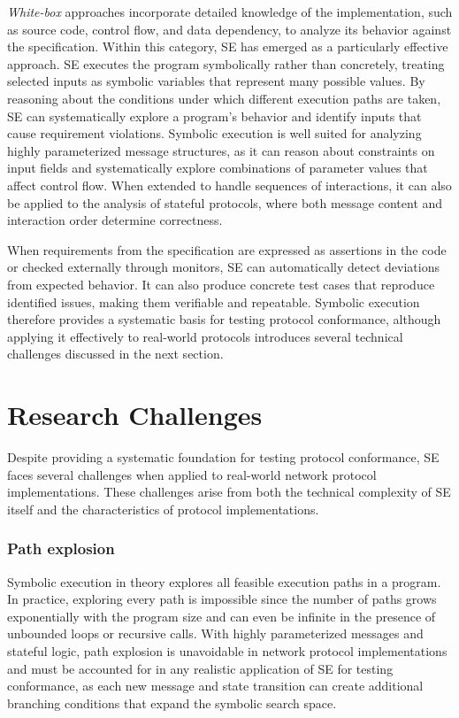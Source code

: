 \emph{White-box} approaches incorporate detailed knowledge of the implementation, such as source code, control flow, and data dependency, to analyze its behavior against the specification.
Within this category, SE has emerged as a particularly effective approach.
SE executes the program symbolically rather than concretely, treating selected inputs as symbolic variables that represent many possible values.
By reasoning about the conditions under which different execution paths are taken, SE can systematically explore a program's behavior and identify inputs that cause requirement violations.
Symbolic execution is well suited for analyzing highly parameterized message structures, as it can reason about constraints on input fields and systematically explore combinations of parameter values that affect control flow.
When extended to handle sequences of interactions, it can also be applied to the analysis of stateful protocols, where both message content and interaction order determine correctness.

When requirements from the specification are expressed as assertions in the code or checked externally through monitors, SE can automatically detect deviations from expected behavior.
It can also produce concrete test cases that reproduce identified issues, making them verifiable and repeatable.
Symbolic execution therefore provides a systematic basis for testing protocol conformance, although applying it effectively to real-world protocols introduces several technical challenges discussed in the next section.

\section{Research Challenges}
Despite providing a systematic foundation for testing protocol conformance, SE faces several challenges when applied to real-world network protocol implementations.
These challenges arise from both the technical complexity of SE itself and the characteristics of protocol implementations.

\subsubsection{Path explosion}
Symbolic execution in theory explores all feasible execution paths in a program.
In practice, exploring every path is impossible since the number of paths grows exponentially with the program size and can even be infinite in the presence of unbounded loops or recursive calls.
With highly parameterized messages and stateful logic, path explosion is unavoidable in network protocol implementations and must be accounted for in any realistic application of SE for testing conformance, as each new message and state transition can create additional branching conditions that expand the symbolic search space.


